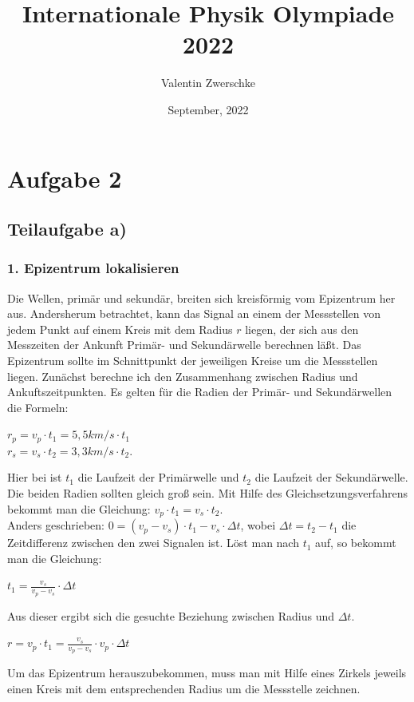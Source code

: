 \documentclass{article}
\title{Internationale Physik Olympiade 2022}
\author{Valentin Zwerschke}
\date{September, 2022}
\begin{document}
\maketitle
\section*{Aufgabe 2}
\subsection*{Teilaufgabe a)}
\subsubsection*{1. Epizentrum lokalisieren}
Die Wellen, primär und sekundär, breiten sich kreisförmig vom Epizentrum her aus. Andersherum betrachtet, kann das Signal an einem der Messstellen von jedem Punkt auf einem Kreis mit dem Radius $r$ liegen, 
der sich aus den Messzeiten der Ankunft Primär- und Sekundärwelle berechnen läßt. 
Das Epizentrum sollte im Schnittpunkt der jeweiligen Kreise um die Messstellen liegen. 
Zunächst berechne ich den Zusammenhang zwischen Radius und Ankuftszeitpunkten. 
Es gelten für die Radien der Primär- und Sekundärwellen die Formeln: 
\begin{center}
	$r_{p} = v_p \cdot t_1 = 5,5 km/s \cdot t_1$ \\ 
	$r_{s} = v_s \cdot t_2 = 3,3 km/s \cdot t_2$.
\end{center}
Hier bei ist $t_1$ die Laufzeit der Primärwelle und $t_2$ die Laufzeit der Sekundärwelle.\\
Die beiden Radien sollten gleich groß sein. Mit Hilfe des Gleichsetzungsverfahrens bekommt man die Gleichung: 
\space \space $v_p \cdot t_1  = v_s \cdot t_2$.\\
Anders geschrieben: $0 = (v_p-v_s) \cdot t_1  - v_s \cdot \Delta t$, 
wobei $\Delta t = t_2- t_1$ die Zeitdifferenz zwischen den zwei Signalen ist. 
Löst man nach $t_1$ auf, so bekommt man die Gleichung:
\begin{center}
	\item $t_1 = \frac{v_s }{v_p - v_s}\cdot \Delta t$ 
\end{center}
Aus dieser ergibt sich die gesuchte Beziehung zwischen Radius und $\Delta t$. 
\begin{center}
	\item $r = v_p \cdot t_1 = \frac{v_s}{v_p - v_s} \cdot v_p \cdot \Delta t$
\end{center}
Um das Epizentrum herauszubekommen, muss man mit Hilfe eines Zirkels jeweils einen Kreis mit dem entsprechenden Radius um die Messstelle zeichnen. 
\end{document}
